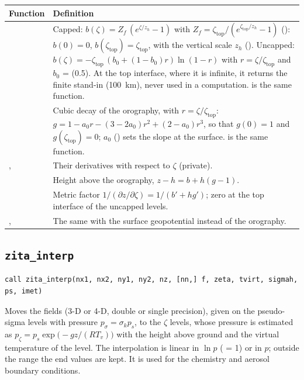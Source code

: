 \begin{longtable}{L{5cm} L{9cm}}
  \toprule
  \textbf{Function} & \textbf{Definition} \\
  \midrule
  \endhead
  \bottomrule
  \endfoot
   &
    Capped: $b(\zeta) = Z_f\,(e^{\zeta/z_h} - 1)$ with
    $Z_f = \zeta_\text{top}/(e^{\zeta_\text{top}/z_h} - 1)$
    (): $b(0) = 0$, $b(\zeta_\text{top}) = \zeta_\text{top}$,
    with the vertical scale $z_h$ ().
    Uncapped: $b(\zeta) = -\zeta_\text{top}\,(b_0 + (1-b_0)r)\ln(1 - r)$
    with $r = \zeta/\zeta_\text{top}$ and $b_0$ =  (0.5). At
    the top interface, where it is infinite, it returns the finite stand-in
     (100~km), never used in a computation.
     is the same function. \\
   &
    Cubic decay of the orography, with $r = \zeta/\zeta_\text{top}$:
    $g = 1 - a_0 r - (3 - 2a_0)r^2 + (2 - a_0)r^3$, so that $g(0) = 1$
    and $g(\zeta_\text{top}) = 0$; $a_0$ () sets the slope at
    the surface.  is the same function. \\
  ,  &
    Their derivatives with respect to $\zeta$ (private). \\
   &
    Height above the orography, $z - h = b + h(g - 1)$. \\
   &
    Metric factor $1/(\partial z/\partial\zeta) = 1/(b' + h g')$; zero at
    the top interface of the uncapped levels. \\
  ,  &
    The same with the surface geopotential instead of the orography. \\
\end{longtable}

\subsection{\texttt{zita\_interp}}

\begin{lstlisting}
call zita_interp(nx1, nx2, ny1, ny2, nz, [nn,] f, zeta, tvirt, sigmah, ps, imet)
\end{lstlisting}

Moves the fields  (3-D or 4-D, double or single precision), given
on the pseudo-sigma levels with pressure $p_\sigma = \sigma_k p_s$, to the
$\zeta$ levels, whose pressure is estimated as
$p_\zeta = p_s\exp\bigl(-g z/(R T_v)\bigr)$ with the height above ground
 and the virtual temperature of the level. The interpolation is
linear in $\ln p$ ( = 1) or in $p$; outside the range the end
values are kept. It is used for the chemistry and aerosol boundary
conditions.

